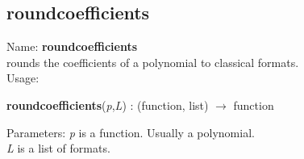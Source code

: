 \subsection{ roundcoefficients }
\noindent Name: \textbf{roundcoefficients}\\
rounds the coefficients of a polynomial to classical formats.\\

\noindent Usage: 
\begin{center}
\textbf{roundcoefficients}(\emph{p},\emph{L}) : (\textsf{function}, \textsf{list}) $\rightarrow$ \textsf{function}\\
\end{center}
Parameters: 
\emph{p} is a function. Usually a polynomial.\\
\emph{L} is a list of formats.\\

